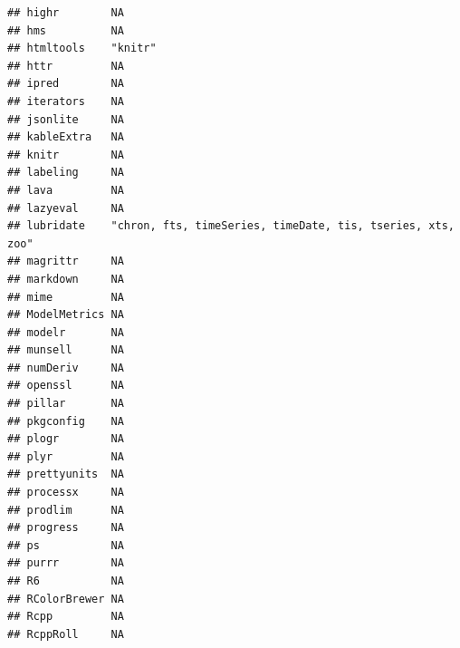 \documentclass[]{article}
\begin{document}
\begin{verbatim}
## highr        NA                                                        
## hms          NA                                                        
## htmltools    "knitr"                                                   
## httr         NA                                                        
## ipred        NA                                                        
## iterators    NA                                                        
## jsonlite     NA                                                        
## kableExtra   NA                                                        
## knitr        NA                                                        
## labeling     NA                                                        
## lava         NA                                                        
## lazyeval     NA                                                        
## lubridate    "chron, fts, timeSeries, timeDate, tis, tseries, xts, zoo"
## magrittr     NA                                                        
## markdown     NA                                                        
## mime         NA                                                        
## ModelMetrics NA                                                        
## modelr       NA                                                        
## munsell      NA                                                        
## numDeriv     NA                                                        
## openssl      NA                                                        
## pillar       NA                                                        
## pkgconfig    NA                                                        
## plogr        NA                                                        
## plyr         NA                                                        
## prettyunits  NA                                                        
## processx     NA                                                        
## prodlim      NA                                                        
## progress     NA                                                        
## ps           NA                                                        
## purrr        NA                                                        
## R6           NA                                                        
## RColorBrewer NA                                                        
## Rcpp         NA                                                        
## RcppRoll     NA                                                        

\end{verbatim}
\end{document}
